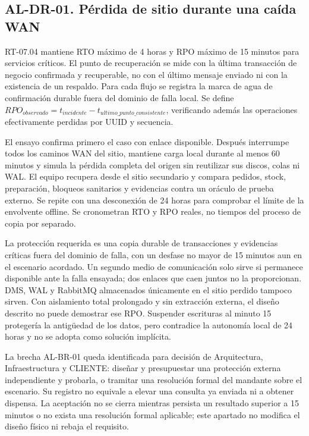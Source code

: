 \subsection*{AL-DR-01. Pérdida de sitio durante una caída WAN}
RT-07.04 mantiene RTO máximo de 4 horas y RPO máximo de 15 minutos para servicios críticos. El punto de recuperación se mide con la última transacción de negocio confirmada y recuperable, no con el último mensaje enviado ni con la existencia de un respaldo. Para cada flujo se registra la marca de agua de confirmación durable fuera del dominio de falla local. Se define $RPO_{observado}=t_{incidente}-t_{ultimo\_punto\_consistente}$, verificando además las operaciones efectivamente perdidas por UUID y secuencia.

El ensayo confirma primero el caso con enlace disponible. Después interrumpe todos los caminos WAN del sitio, mantiene carga local durante al menos 60 minutos y simula la pérdida completa del origen sin reutilizar sus discos, colas ni WAL. El equipo recupera desde el sitio secundario y compara pedidos, stock, preparación, bloqueos sanitarios y evidencias contra un oráculo de prueba externo. Se repite con una desconexión de 24 horas para comprobar el límite de la envolvente offline. Se cronometran RTO y RPO reales, no tiempos del proceso de copia por separado.

La protección requerida es una copia durable de transacciones y evidencias críticas fuera del dominio de falla, con un desfase no mayor de 15 minutos aun en el escenario acordado. Un segundo medio de comunicación solo sirve si permanece disponible ante la falla ensayada; dos enlaces que caen juntos no la proporcionan. DMS, WAL y RabbitMQ almacenados únicamente en el sitio perdido tampoco sirven. Con aislamiento total prolongado y sin extracción externa, el diseño descrito no puede demostrar ese RPO. Suspender escrituras al minuto 15 protegería la antigüedad de los datos, pero contradice la autonomía local de 24 horas y no se adopta como solución implícita.

La brecha AL-BR-01 queda identificada para decisión de Arquitectura, Infraestructura y CLIENTE: diseñar y presupuestar una protección externa independiente y probarla, o tramitar una resolución formal del mandante sobre el escenario. Su registro no equivale a elevar una consulta ya enviada ni a obtener dispensa. La aceptación no se cierra mientras persista un resultado superior a 15 minutos o no exista una resolución formal aplicable; este apartado no modifica el diseño físico ni rebaja el requisito.

